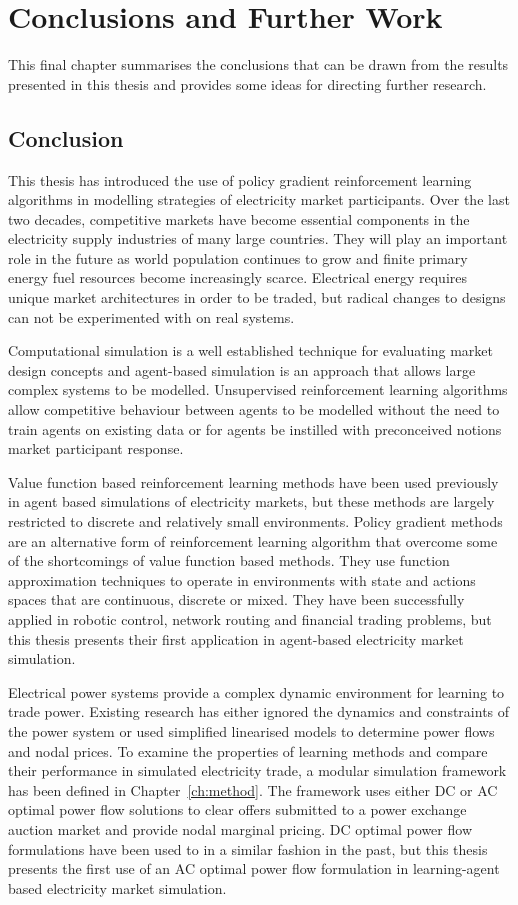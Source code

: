 \chapter{Conclusions and Further Work}
\label{ch:conclusion}
This final chapter summarises the conclusions that can be drawn from the results
presented in this thesis and provides some ideas for directing further research.

\section{Conclusion}
This thesis has introduced the use of policy gradient reinforcement learning
algorithms in modelling strategies of electricity market participants. Over the
last two decades, competitive markets have become essential components in the
electricity supply industries of many large countries.  They will play an
important role in the future as world population continues to grow and finite
primary energy fuel resources become increasingly scarce.  Electrical energy
requires unique market architectures in order to be traded, but radical changes
to designs can not be experimented with on real systems.

Computational simulation is a well established technique for evaluating market
design concepts and agent-based simulation is an approach that allows large
complex systems to be modelled.  Unsupervised reinforcement learning algorithms
allow competitive behaviour between agents to be modelled without the need to
train agents on existing data or for agents be instilled with preconceived
notions market participant response.

Value function based reinforcement learning methods have been used previously in
agent based simulations of electricity markets, but these methods are largely
restricted to discrete and relatively small environments.  Policy gradient
methods are an alternative form of reinforcement learning algorithm that
overcome some of the shortcomings of value function based methods. They use
function approximation techniques to operate in environments with state and
actions spaces that are continuous, discrete or mixed.  They have been
successfully applied in robotic control, network routing and financial trading
problems, but this thesis presents their first application in agent-based
electricity market simulation.

Electrical power systems provide a complex dynamic environment for learning to
trade power.  Existing research has either ignored the dynamics and constraints
of the power system or used simplified linearised models to determine power
flows and nodal prices.  To examine the properties of learning methods and
compare their performance in simulated electricity trade, a modular simulation
framework has been defined in Chapter~\ref{ch:method}.  The framework uses
either DC or AC optimal power flow solutions to clear offers submitted to a
power exchange auction market and provide nodal marginal pricing. DC optimal
power flow formulations have been used to in a similar fashion in the past, but
this thesis presents the first use of an AC optimal power flow formulation in
learning-agent based electricity market simulation.

